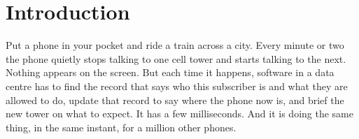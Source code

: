 \documentclass[english,twoside,openright,a4paper,censored,csm,software-track-2020]{HYthesisML}
\begin{document}
{\begin{otherlanguage}{english}
\begin{abstract}
\noindent\textbf{Conclusions.}
The choice here is not about performance but about which defects an organisation wants to make
unwriteable, and whether it will pay for them in engineering effort instead of run time. Rust
removes data races, not concurrency bugs in general. The thesis leaves a frozen specification,
two parity-tested implementations, a measurement framework, and a defect catalogue marking
where the guarantee ends.
\end{abstract}
\end{otherlanguage}
}

\cleardoublepage
{}
\setcounter{page}{1}
\tableofcontents

\cleardoublepage
{}
{}
\listoffigures

\cleardoublepage
{}
{}
\listoftables

\cleardoublepage

\mainmatter

\chapter{Introduction}

Put a phone in your pocket and ride a train across a city. Every minute or two the phone
quietly stops talking to one cell tower and starts talking to the next. Nothing appears on
the screen. But each time it happens, software in a data centre has to find the record that
says who this subscriber is and what they are allowed to do, update that record to say where
the phone now is, and brief the new tower on what to expect. It has a few milliseconds. And
it is doing the same thing, in the same instant, for a million other phones.
\end{document}
